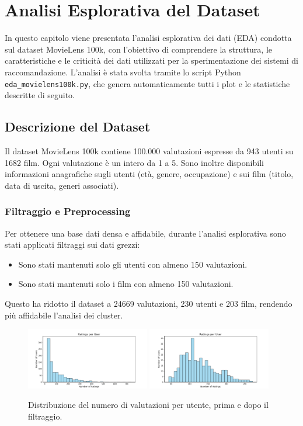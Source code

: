 \chapter{Analisi Esplorativa del Dataset}
\label{chap:chap3}

In questo capitolo viene presentata l'analisi esplorativa dei dati (EDA) condotta sul dataset MovieLens 100k, con l'obiettivo di comprendere la struttura, le caratteristiche e le criticità dei dati utilizzati per la sperimentazione dei sistemi di raccomandazione. L'analisi è stata svolta tramite lo script Python \texttt{eda\_movielens100k.py}, che genera automaticamente tutti i plot e le statistiche descritte di seguito.

\section{Descrizione del Dataset}
Il dataset MovieLens 100k contiene 100.000 valutazioni espresse da 943 utenti su 1682 film. Ogni valutazione è un intero da 1 a 5. Sono inoltre disponibili informazioni anagrafiche sugli utenti (età, genere, occupazione) e sui film (titolo, data di uscita, generi associati).

\subsection{Filtraggio e Preprocessing}
Per ottenere una base dati densa e affidabile, durante l'analisi esplorativa sono stati applicati filtraggi sui dati grezzi:
\begin{itemize}
    \item Sono stati mantenuti solo gli utenti con almeno 150 valutazioni.
    \item Sono stati mantenuti solo i film con almeno 150 valutazioni.
\end{itemize}
Questo ha ridotto il dataset a 24669 valutazioni, 230 utenti e 203 film, rendendo più affidabile l'analisi dei cluster.   

\begin{figure}[H]
  \centering
  \includegraphics[width=0.48\textwidth]{../output/eda/before_cut/before_ratings_per_user_hist.png}
  \includegraphics[width=0.48\textwidth]{../output/eda/after_cut/after_ratings_per_user_hist.png}
  \caption{Distribuzione del numero di valutazioni per utente, prima e dopo il filtraggio.}
\end{figure}


